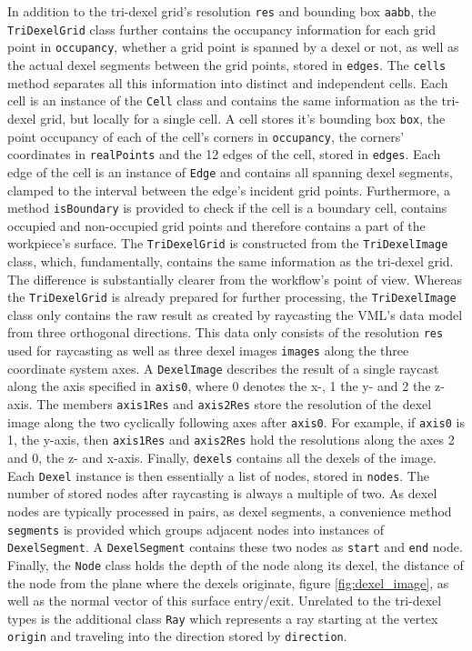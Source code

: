 In addition to the tri-dexel grid's resolution \lstinline!res! and bounding box \lstinline!aabb!, the \lstinline!TriDexelGrid! class further contains the occupancy information for each grid point in \lstinline!occupancy!, \ie whether a grid point is spanned by a dexel or not, as well as the actual dexel segments between the grid points, stored in \lstinline!edges!.
The \lstinline!cells! method separates all this information into distinct and independent cells.
Each cell is an instance of the \lstinline!Cell! class and contains the same information as the tri-dexel grid, but locally for a single cell.
A cell stores it's bounding box \lstinline!box!, the point occupancy of each of the cell's corners in \lstinline!occupancy!, the corners' coordinates in \lstinline!realPoints! and the 12 edges of the cell, stored in \lstinline!edges!.
Each edge of the cell is an instance of \lstinline!Edge! and contains all spanning dexel segments, clamped to the interval between the edge's incident grid points.
Furthermore, a method \lstinline!isBoundary! is provided to check if the cell is a boundary cell, \ie contains occupied and non-occupied grid points and therefore contains a part of the workpiece's surface.
The \lstinline!TriDexelGrid! is constructed from the \lstinline!TriDexelImage! class, which, fundamentally, contains the same information as the tri-dexel grid.
The difference is substantially clearer from the workflow's point of view.
Whereas the \lstinline!TriDexelGrid! is already prepared for further processing, the \lstinline!TriDexelImage! class only contains the raw result as created by raycasting the VML's data model from three orthogonal directions.
This data only consists of the resolution \lstinline!res! used for raycasting as well as three dexel images \lstinline!images! along the three coordinate system axes.
A \lstinline!DexelImage! describes the result of a single raycast along the axis specified in \lstinline!axis0!, where 0 denotes the x-, 1 the y- and 2 the z-axis.
The members \lstinline!axis1Res! and \lstinline!axis2Res! store the resolution of the dexel image along the two cyclically following axes after \lstinline!axis0!.
For example, if \lstinline!axis0! is 1, the y-axis, then \lstinline!axis1Res! and \lstinline!axis2Res! hold the resolutions along the axes 2 and 0, the z- and x-axis.
Finally, \lstinline!dexels! contains all the dexels of the image.
Each \lstinline!Dexel! instance is then essentially a list of nodes, stored in \lstinline!nodes!.
The number of stored nodes after raycasting is always a multiple of two.
As dexel nodes are typically processed in pairs, as dexel segments, a convenience method \lstinline!segments! is provided which groups adjacent nodes into instances of \lstinline!DexelSegment!.
A \lstinline!DexelSegment! contains these two nodes as \lstinline!start! and \lstinline!end! node.
Finally, the \lstinline!Node! class holds the depth of the node along its dexel, \ie the distance of the node from the plane where the dexels originate, \cf figure \ref{fig:dexel_image}, as well as the normal vector of this surface entry/exit.
Unrelated to the tri-dexel types is the additional class \lstinline!Ray! which represents a ray starting at the vertex \lstinline!origin! and traveling into the direction stored by \lstinline!direction!.

